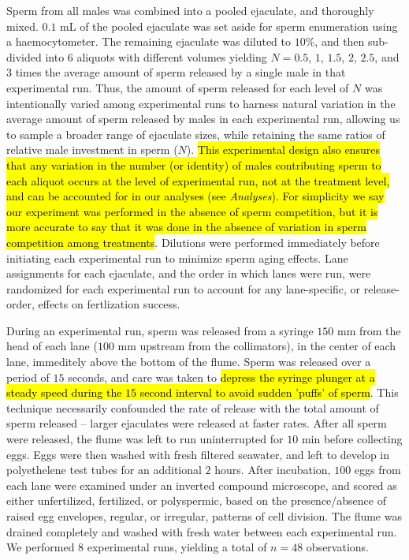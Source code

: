 \documentclass{article}
\begin{document}
	Sperm from all males was combined into a pooled ejaculate, and thoroughly mixed. $0.1$ mL of the pooled ejaculate was set aside for sperm enumeration using a haemocytometer. The remaining ejaculate was diluted to $10$\%, and then sub-divided into $6$ aliquots with different volumes yielding $N = 0.5$, $1$, $1.5$, $2$, $2.5$, and $3$ times the average amount of sperm released by a single male in that experimental run. Thus, the amount of sperm released for each level of $N$ was intentionally varied among experimental runs to harness natural variation in the average amount of sperm released by males in each experimental run, allowing us to sample a broader range of ejaculate sizes, while retaining the same ratios of relative male investment in sperm ($N$). \hl{This experimental design also ensures that any variation in the number (or identity) of males contributing sperm to each aliquot occurs at the level of experimental run, not at the treatment level, and can be accounted for in our analyses (see \textit{Analyses}). For simplicity we say our experiment was performed in the absence of sperm competition, but it is more accurate to say that it was done in the absence of variation in sperm competition among treatments}. Dilutions were performed immediately before initiating each experimental run to minimize sperm aging effects. Lane assignments for each ejaculate, and the order in which lanes were run, were randomized for each experimental run to account for any lane-specific, or release-order, effects on fertlization success.

	During an experimental run, sperm was released from a syringe $150$ mm from the head of each lane ($100$ mm upstream from the collimators), in the center of each lane, immeditely above the bottom of the flume. Sperm was released over a period of $15$ seconds, and care was taken to \hl{depress the syringe plunger at a steady speed during the $15$ second interval to avoid sudden 'puffs' of sperm}. This technique necessarily confounded the rate of release with the total amount of sperm released -- larger ejaculates were released at faster rates. After all sperm were released, the flume was left to run uninterrupted for $10$ min before collecting eggs. Eggs were then washed with fresh filtered seawater, and left to develop in polyethelene test tubes for an additional $2$ hours. After incubation, $100$ eggs from each lane were examined under an inverted compound microscope, and scored as either unfertilized, fertilized, or polyspermic, based on the presence/absence of raised egg envelopes, regular, or irregular, patterns of cell division. The flume was drained completely and washed with fresh water between each experimental run. We performed $8$ experimental runs, yielding a total of $n=48$ observations.
\end{document}
